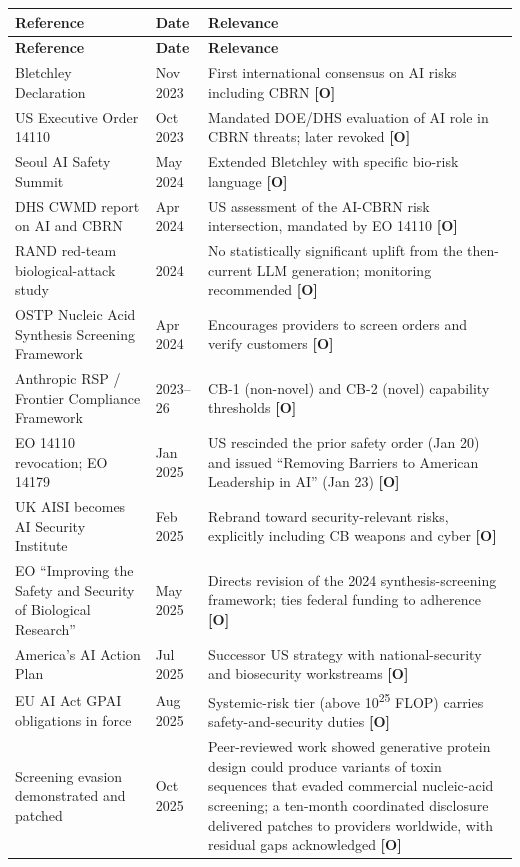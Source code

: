 \documentclass[11pt,letterpaper]{article}
\begin{document}
\begin{center}
\small
\begin{longtable}{L{4cm}L{1.8cm}L{9.2cm}}
\toprule
\textbf{Reference} & \textbf{Date} & \textbf{Relevance} \\
\midrule
\endfirsthead
\toprule
\textbf{Reference} & \textbf{Date} & \textbf{Relevance} \\
\midrule
\endhead
Bletchley Declaration & Nov 2023 & First international consensus on AI risks including CBRN \textbf{[O]} \\
US Executive Order 14110 & Oct 2023 & Mandated DOE/DHS evaluation of AI role in CBRN threats; later revoked \textbf{[O]} \\
Seoul AI Safety Summit & May 2024 & Extended Bletchley with specific bio-risk language \textbf{[O]} \\
DHS CWMD report on AI and CBRN & Apr 2024 & US assessment of the AI-CBRN risk intersection, mandated by EO 14110 \textbf{[O]} \\
RAND red-team biological-attack study & 2024 & No statistically significant uplift from the then-current LLM generation; monitoring recommended \textbf{[O]} \\
OSTP Nucleic Acid Synthesis Screening Framework & Apr 2024 & Encourages providers to screen orders and verify customers \textbf{[O]} \\
Anthropic RSP / Frontier Compliance Framework & 2023--26 & CB-1 (non-novel) and CB-2 (novel) capability thresholds \textbf{[O]} \\
EO 14110 revocation; EO 14179 & Jan 2025 & US rescinded the prior safety order (Jan 20) and issued ``Removing Barriers to American Leadership in AI'' (Jan 23) \textbf{[O]} \\
UK AISI becomes AI Security Institute & Feb 2025 & Rebrand toward security-relevant risks, explicitly including CB weapons and cyber \textbf{[O]} \\
EO ``Improving the Safety and Security of Biological Research'' & May 2025 & Directs revision of the 2024 synthesis-screening framework; ties federal funding to adherence \textbf{[O]} \\
America's AI Action Plan & Jul 2025 & Successor US strategy with national-security and biosecurity workstreams \textbf{[O]} \\
EU AI Act GPAI obligations in force & Aug 2025 & Systemic-risk tier (above 10\textsuperscript{25} FLOP) carries safety-and-security duties \textbf{[O]} \\
Screening evasion demonstrated and patched & Oct 2025 & Peer-reviewed work showed generative protein design could produce variants of toxin sequences that evaded commercial nucleic-acid screening; a ten-month coordinated disclosure delivered patches to providers worldwide, with residual gaps acknowledged \textbf{[O]} \\

\end{longtable}
\end{center}
\end{document}
